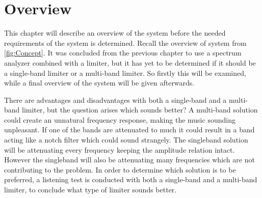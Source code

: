 \chapter{Overview} \label{ch:overview}
This chapter will describe an overview of the system before the needed requirements of the system is determined. Recall the overview of system from \autoref{fig:Concept}. It was concluded from the previous chapter to use a spectrum analyzer combined with a limiter, but it has yet to be determined if it should be a single-band limiter or a multi-band limiter. So firstly this will be examined, while a final overview of the system will be given afterwards. 


There are advantages and disadvantages with both a single-band and a multi-band limiter, but the question arises which sounds better?
A multi-band solution could create an unnatural frequency response, making the music sounding unpleasant. If one of the bands are attenuated to much it could result in a band acting like a notch filter which could sound strangely. The singleband solution will be attenuating every frequency keeping the amplitude relation intact. However the singleband will also be attenuating many frequencies which are not contributing to the problem. In order to determine which solution is to be preferred, a listening test is conducted with both a single-band and a multi-band limiter, to conclude what type of limiter sounds better. 

